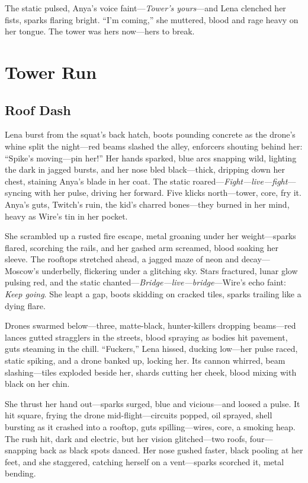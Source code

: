 \documentclass[12pt]{book}
\begin{document}
The static pulsed, Anya’s voice faint---\emph{Tower’s yours}---and Lena clenched her fists, sparks flaring bright. ``I’m coming,'' she muttered, blood and rage heavy on her tongue. The tower was hers now---hers to break.

\chapter{Tower Run}

\section{Roof Dash}

Lena burst from the squat’s back hatch, boots pounding concrete as the drone’s whine split the night---red beams slashed the alley, enforcers shouting behind her: “Spike’s moving---pin her!” Her hands sparked, blue arcs snapping wild, lighting the dark in jagged bursts, and her nose bled black---thick, dripping down her chest, staining Anya’s blade in her coat. The static roared---\emph{Fight---live---fight}---syncing with her pulse, driving her forward. Five klicks north---tower, core, fry it. Anya’s guts, Twitch’s ruin, the kid’s charred bones---they burned in her mind, heavy as Wire’s tin in her pocket.

She scrambled up a rusted fire escape, metal groaning under her weight---sparks flared, scorching the rails, and her gashed arm screamed, blood soaking her sleeve. The rooftops stretched ahead, a jagged maze of neon and decay---Moscow’s underbelly, flickering under a glitching sky. Stars fractured, lunar glow pulsing red, and the static chanted---\emph{Bridge---live---bridge}---Wire’s echo faint: \emph{Keep going}. She leapt a gap, boots skidding on cracked tiles, sparks trailing like a dying flare.

Drones swarmed below---three, matte-black, hunter-killers dropping beams---red lances gutted stragglers in the streets, blood spraying as bodies hit pavement, guts steaming in the chill. ``Fuckers,'' Lena hissed, ducking low---her pulse raced, static spiking, and a drone banked up, locking her. Its cannon whirred, beam slashing---tiles exploded beside her, shards cutting her cheek, blood mixing with black on her chin.

She thrust her hand out---sparks surged, blue and vicious---and loosed a pulse. It hit square, frying the drone mid-flight---circuits popped, oil sprayed, shell bursting as it crashed into a rooftop, guts spilling---wires, core, a smoking heap. The rush hit, dark and electric, but her vision glitched---two roofs, four---snapping back as black spots danced. Her nose gushed faster, black pooling at her feet, and she staggered, catching herself on a vent---sparks scorched it, metal bending.
\end{document}
